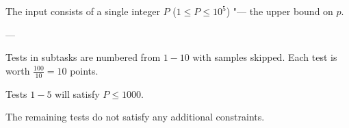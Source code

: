 The input consists of a single integer $P$ ($1 \le P \le 10^5$) "--- the upper bound on $p$.

---

Tests in subtasks are numbered from $1 - 10$ with samples skipped. Each test is worth $\frac{100}{10}=10$ points.


Tests $1 - 5$ will satisfy $P \le 1000$.

The remaining tests do not satisfy any additional constraints.
